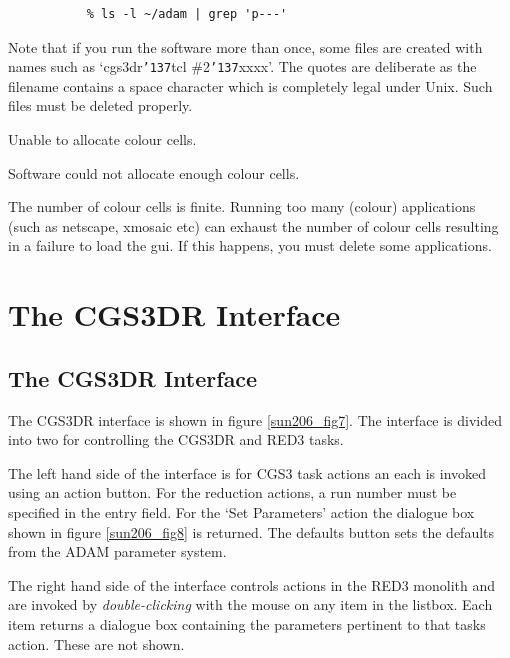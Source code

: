 \documentclass[a4paper]{book}
\newcommand{\stardocinitials}  {SUN}
\newcommand{\stardocnumber}    {206.1}
\newcommand{\stardocname}{\stardocinitials /\stardocnumber}
\renewcommand{\_}{{\tt\char'137}}
\begin{document}
\begin{description}
  \begin{verbatim}
           % ls -l ~/adam | grep 'p---'
  \end{verbatim}

  Note that if you run the software more than once, some files are created with names such as
  `cgs3dr\_tcl \#2\_xxxx'. The quotes are deliberate as the filename contains a space character
  which is completely legal under Unix. Such files must be deleted properly.

\item[] {\sf Unable to allocate colour cells.}

  Software could not allocate enough colour cells.

  The number of colour cells is finite. Running too many (colour) applications (such as
  netscape, xmosaic etc) can exhaust the number of colour cells resulting in a failure
  to load the {\sc gui}. If this happens, you must delete some applications.
\end{description}

\chapter{The CGS3DR Interface}
\markboth{CGS3DR Interface}{\stardocname}
\section{The CGS3DR Interface}
The CGS3DR interface is shown in figure \ref{sun206_fig7}.
The interface is divided into two for controlling the CGS3DR and RED3 tasks.

The left hand side of the interface is for CGS3 task actions an each is invoked using
an action button. For the reduction actions, a run number must be specified in the
entry field. For the `Set Parameters' action the dialogue box shown in figure \ref{sun206_fig8}
is returned. The defaults button sets the defaults from the ADAM parameter system.

The right hand side of the interface controls actions in the RED3 monolith and are
invoked by {\em double-clicking} with the mouse on any item in the
listbox. Each item returns a dialogue box containing the parameters pertinent to that
tasks action. These are not shown. 
\end{document}
